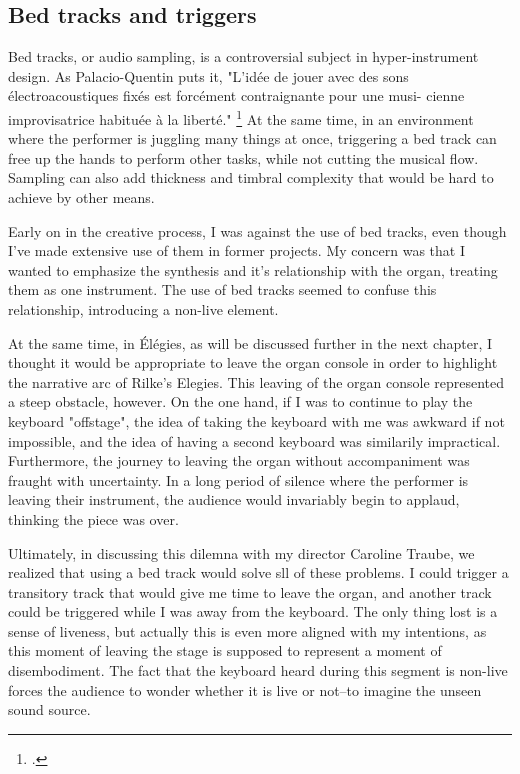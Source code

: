 \documentclass[12pt,twoside,maitrise]{dms_ks}
\theoremstyle{definition}
\begin{document}
{\subsection{Bed tracks and triggers}

Bed tracks, or audio sampling, is a controversial subject in hyper-instrument design.
As Palacio-Quentin puts it, "L’idée de jouer avec des sons électroacoustiques fixés est forcément contraignante pour une musi- cienne improvisatrice habituée à la liberté." \footcite[50]{palacio-quintin_composition_2012-1}
At the same time, in an environment where the performer is juggling many things at once, triggering a bed track can free up the hands to perform other tasks, while not cutting the musical flow. 
Sampling can also add thickness and timbral complexity that would be hard to achieve by other means. 

Early on in the creative process, I was against the use of bed tracks, even though I've made extensive use of them in former projects. 
My concern was that I wanted to emphasize the synthesis and it's relationship with the organ, treating them as one instrument. 
The use of bed tracks seemed to confuse this relationship, introducing a non-live element.

At the same time, in Élégies, as will be discussed further in the next chapter, I thought it would be appropriate to leave the organ console in order to highlight the narrative arc of Rilke's Elegies. 
This leaving of the organ console represented a steep obstacle, however. 
On the one hand, if I was to continue to play the keyboard "offstage", the idea of taking the keyboard with me was awkward if not impossible, and the idea of having a second keyboard was similarily impractical. 
Furthermore, the journey to leaving the organ without accompaniment was fraught with uncertainty. 
In a long period of silence where the performer is leaving their instrument, the audience would invariably begin to applaud, thinking the piece was over.

Ultimately, in discussing this dilemna with my director Caroline Traube, we realized that using a bed track would solve sll of these problems. 
I could trigger a transitory track that would give me time to leave the organ, and another track could be triggered while I was away from the keyboard. 
The only thing lost is a sense of liveness, but actually this is even more aligned with my intentions, as this moment of leaving the stage is supposed to represent a moment of disembodiment. 
The fact that the keyboard heard during this segment is non-live forces the audience to wonder whether it is live or not--to imagine the unseen sound source. 

}
\end{document}
